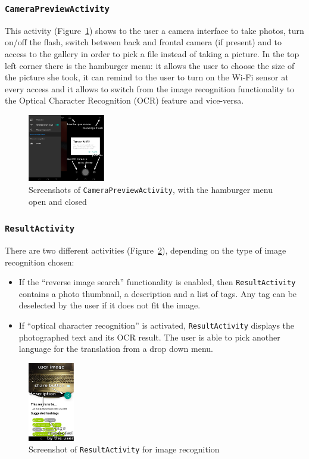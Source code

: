 \subsubsection{\texttt{CameraPreviewActivity}}
This activity (Figure~\ref{fig:mainActivity}) shows to the user a camera
interface  to take photos, turn on/off the flash, switch between back and
frontal camera (if present) and to access to the gallery in order to pick a file
instead of taking a picture. In the top left corner there is the hamburger
menu: it allows the user to choose the size of the picture she took, it can remind 
to the user to turn on the Wi-Fi sensor at every access and it allows to switch 
from the image recognition functionality to the Optical Character Recognition (OCR)
feature and vice-versa.
\begin{figure}[h]
    \centering
    \includegraphics[width=0.30\textwidth]{../img/main_activity}
    \caption{Screenshots of \texttt{CameraPreviewActivity}, with the hamburger
menu open and closed}
    \label{fig:mainActivity}
\end{figure}

\subsubsection{\texttt{ResultActivity}}
There are two different activities (Figure~\ref{fig:imageResultActivity}),
depending on the type of image recognition chosen:
\begin{itemize}
        \item If the ``reverse image search'' functionality is enabled, then
\texttt{ResultActivity} contains a photo thumbnail, a description and a list of
tags. Any tag can be deselected by the user if it does not fit the image.
    \item If ``optical character recognition'' is activated,
\texttt{ResultActivity} displays the photographed text and its OCR result.
The user is able to pick another language for the translation from a drop down menu.
\end{itemize}

\begin{figure}[h]
    \centering
    \includegraphics[width=0.18\textwidth]{../img/image_result_activity}
    \caption{Screenshot of \texttt{ResultActivity} for image recognition}
    \label{fig:imageResultActivity}
\end{figure}

